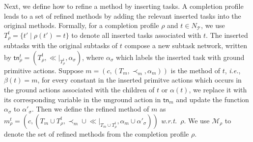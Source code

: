 \documentclass[letterpaper]{article} %
\newtheorem{definition}{Definition}
\newcommand{\Operators}{\mathcal{O}}
\newcommand{\Cactions}{\mathcal{C}}
\newcommand{\HtnDomain}{\mathfrak{D}}
\newcommand{\Methods}{\mathcal{M}}
\newcommand{\SuperMethods}{\overline{\Methods}}
\newcommand{\Lvar}{\mathcal{L}}
\newcommand{\Constraint}{\prec}
\newcommand{\tn}{\mathsf{tn}}
\newcommand{\plan}{\sigma}
\newcommand{\Dtree}{\mathcal{T}}
\newcommand{\Tasksof}{T}
\newcommand{\innernodes}{N_\Dtree}
\newcommand{\insertTask}{t'}
\newcommand{\aspplus}{\textsf{+}}
\newcommand{\aspprec}{\ll}
\newcommand{\improveFunction}{\rho}
\begin{document}
Next, we define how to refine a method by inserting tasks.
A completion profile leads to a set of refined methods by adding the relevant inserted tasks into the original methods. %
Formally, for a completion profile $\improveFunction$ and $t\in \innernodes$,%
we use $T_\improveFunction^t \!=\! \{\insertTask \mid\! \improveFunction(\insertTask)\!=\!t\}$ %
to denote all inserted tasks associated with $t$.
The inserted subtasks with the original subtasks of $t$ compose a new subtask network, written by $\tn_\improveFunction^t = (T_\improveFunction^t,{\aspprec}|_{T_\improveFunction^t},\alpha_\plan)$, where $\alpha_\plan$ which labels the inserted task with ground primitive actions.
Suppose $m = (c, (T_m,\prec_m,\alpha_m))$ is the method of $t$, \emph{i.e.}, $\beta(t)=m$,
for every constant in the inserted primitve actions which occurs in the ground actions associated with the children of $t$ or $\alpha(t)$,
we replace it with its corresponding variable in the unground action in $\tn_m$ and update the function $\alpha_\plan$ to $\alpha'_\plan$.
Then we define the refined method of $m$ as $m_\improveFunction^t \!= \! (c, (T_m \cup T_\improveFunction^t, \prec_m \!\cup\! \aspprec\!|_{T_m \cup T_\improveFunction^t}, \alpha_m \cup \alpha'_\plan))$
\emph{w.r.t.}\ $\improveFunction$.
We use $\Methods_{\improveFunction}$ to denote the set of refined methods from the completion profile $\improveFunction$.
\end{document}
